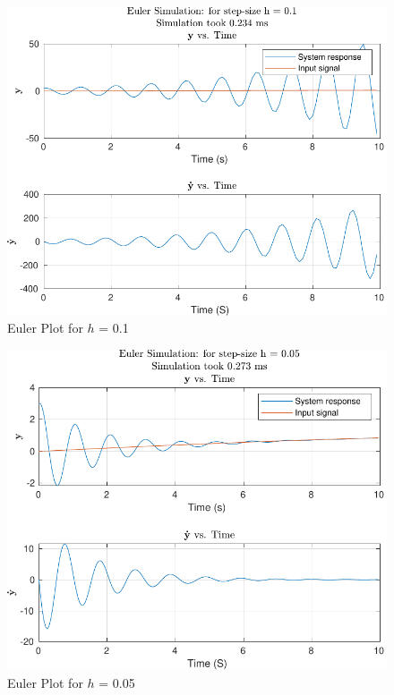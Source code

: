 \documentclass[12pt]{article}
\begin{document}
		\begin{figure}[H]
			\centering
			\includegraphics[width=1\linewidth]{"Code/Fig/Euler_plot_h_0.1.pdf"}
			\caption{Euler Plot for $h$ = 0.1}
			\label{fig:eulerploth01}
		\end{figure}
		\begin{figure}[H]
			\centering
			\includegraphics[width=1\linewidth]{"Code/Fig/Euler_plot_h_0.05.pdf"}
			\caption{Euler Plot for $h$ = 0.05}
			\label{fig:eulerploth005}
		\end{figure}
		
\end{document}
